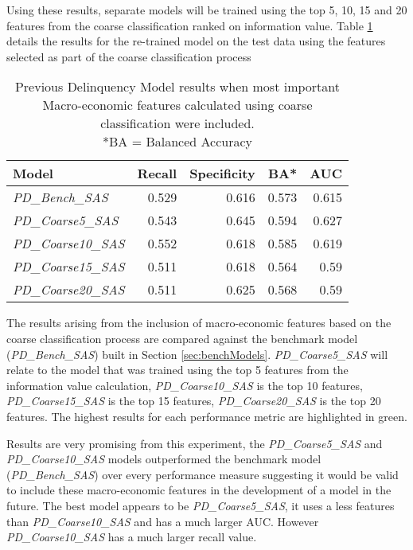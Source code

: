 Using these results, separate models will be trained using the top 5, 10, 15 and 20 features from
the coarse classification ranked on information value. Table \ref{table:CoarsePDModelResults} details the results for the re-trained model
on the test data using the features selected as part of the coarse classification process

\begin{table}[H]
	\centering
	\small
	\begin{tabular}{l r r r r}
		\hline
		\textbf{Model} & \textbf{Recall} & \textbf{Specificity} & \textbf{BA*} & \textbf{AUC}  \\ \hline
		\textit{PD\_Bench\_SAS} & 0.529 & 0.616 & 0.573 & 0.615 \\ \hline
		\textit{PD\_Coarse5\_SAS}  & 0.543 & \cellcolor{green!25}0.645 & \cellcolor{green!25}0.594 & \cellcolor{green!25}0.627   \\ 
		\textit{PD\_Coarse10\_SAS} & \cellcolor{green!25}0.552 & 0.618 & 0.585 & 0.619  \\ 
		\textit{PD\_Coarse15\_SAS} & 0.511 & 0.618 & 0.564 & 0.59  \\
		\textit{PD\_Coarse20\_SAS} & 0.511 & 0.625 & 0.568 & 0.59  \\\hline 
	\end{tabular}
	\caption{Previous Delinquency Model results when most important\\
		Macro-economic features calculated using coarse classification were included.
		\\ *BA = Balanced Accuracy}
	\label{table:CoarsePDModelResults}
\end{table}

The results arising from the inclusion of macro-economic features based on the coarse classification process are compared against the benchmark model (\textit{PD\_Bench\_SAS}) built in Section \ref{sec:benchModels}. \textit{PD\_Coarse5\_SAS} will relate to the model that was trained using the top 5 features from the information value calculation, \textit{PD\_Coarse10\_SAS} is the top 10 features, \textit{PD\_Coarse15\_SAS} is the top 15 features, \textit{PD\_Coarse20\_SAS} is the top 20 features. The highest results for each performance metric are highlighted in green.

Results are very promising from this experiment, the \textit{PD\_Coarse5\_SAS} and \textit{PD\_Coarse10\_SAS} models outperformed the benchmark model (\textit{PD\_Bench\_SAS}) over every performance measure suggesting it would be valid to include these macro-economic features in the development of a model in the future. The best model appears to be \textit{PD\_Coarse5\_SAS}, it uses a less features than \textit{\textit{PD\_Coarse10\_SAS}} and has a much larger AUC. However \textit{PD\_Coarse10\_SAS} has a much larger recall value. 

